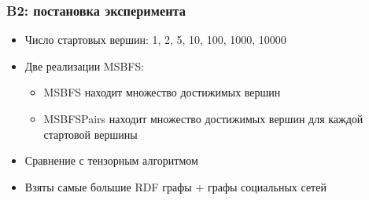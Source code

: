 \documentclass{beamer}
\begin{document}
\begin{frame}[fragile]
  \frametitle{B2: постановка эксперимента}
  \begin{itemize}
    \item Число стартовых вершин: 1, 2, 5, 10, 100, 1000, 10000
    \item Две реализации MSBFS:
          \begin{itemize}
            \item MSBFS находит множество достижимых вершин
            \item MSBFSPairs находит множество достижимых вершин для каждой стартовой вершины
          \end{itemize}
    \item Сравнение с тензорным алгоритмом
    \item Взяты самые большие RDF графы + графы социальных сетей
  \end{itemize}
\end{frame}
\end{document}
